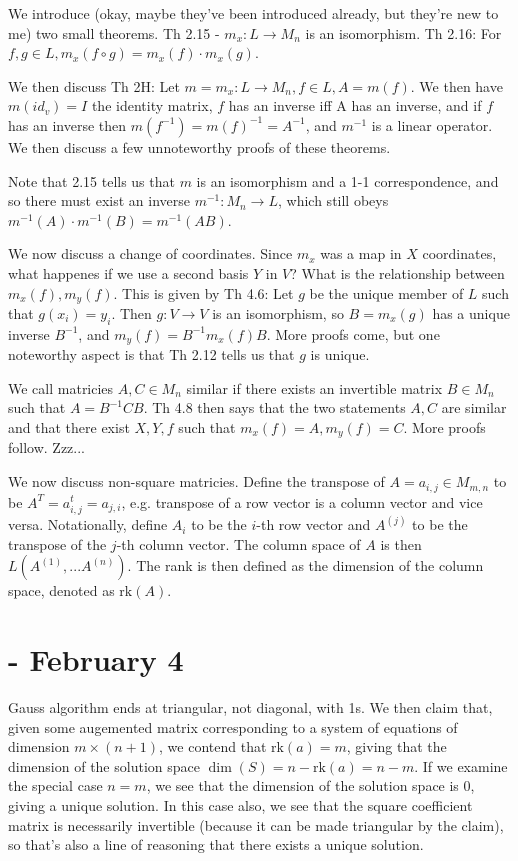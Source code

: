 \documentclass{report}
\begin{document}
We introduce (okay, maybe they've been introduced already, but they're new to me) two small theorems. Th 2.15 - $m_x: L \to M_n$ is an isomorphism. Th 2.16: For $f,g \in L, m_x(f \circ g) = m_x(f) \cdot m_x(g)$.

We then discuss Th 2H: Let $m = m_x: L \to M_n, f\in L, A = m(f)$. We then have $m(id_v) = I$ the identity matrix, $f$ has an inverse iff A has an inverse, and if $f$ has an inverse then $m(f^{-1}) = m(f)^{-1} = A^{-1}$, and $m^{-1}$ is a linear operator. We then discuss a few unnoteworthy proofs of these theorems. 

Note that 2.15 tells us that $m$ is an isomorphism and a 1-1 correspondence, and so there must exist an inverse $m^{-1}: M_n \to L$, which still obeys $m^{-1}(A) \cdot m^{-1}(B) = m^{-1}(AB)$.

We now discuss a change of coordinates. Since $m_x$ was a map in $X$ coordinates, what happenes if we use a second basis $Y$ in $V$? What is the relationship between $m_x(f), m_y(f)$. This is given by Th 4.6: Let $g$ be the unique member of $L$ such that $g(x_i) = y_i$. Then $g: V \to V$ is an isomorphism, so $B = m_x(g)$ has a unique inverse $B^{-1}$, and $m_y(f) = B^{-1}m_x(f)B$. More proofs come, but one noteworthy aspect is that Th 2.12 tells us that $g$ is unique.

We call matricies $A,C \in M_n$ similar if there exists an invertible matrix $B \in M_n$ such that $A = B^{-1}CB$. Th 4.8 then says that the two statements $A,C$ are similar and that there exist $X,Y,f$ such that $m_x(f) = A, m_y(f) = C$. More proofs follow. Zzz...

We now discuss non-square matricies. Define the transpose of $A = a_{i,j} \in M_{m,n}$ to be $A^T = a^t_{i,j} = a_{j,i}$, e.g. transpose of a row vector is a column vector and vice versa. Notationally, define $A_i$ to be the $i$-th row vector and $A^{(j)}$ to be the transpose of the $j$-th column vector. The column space of $A$ is then $L(A^{(1)},...A^{(n)})$. The rank is then defined as the dimension of the column space, denoted as $\mathrm{rk}(A)$. 

\chapter{ - February 4}

Gauss algorithm ends at triangular, not diagonal, with 1s. We then claim that, given some augemented matrix corresponding to a system of equations of dimension $m \times (n+1)$, we contend that $\mathrm{rk}(a) = m$, giving that the dimension of the solution space $\dim(S) = n - \mathrm{rk}(a) = n-m$. If we examine the special case $n=m$, we see that the dimension of the solution space is $0$, giving a unique solution. In this case also, we see that the square coefficient matrix is necessarily invertible (because it can be made triangular by the claim), so that's also a line of reasoning that there exists a unique solution. 
\end{document}
